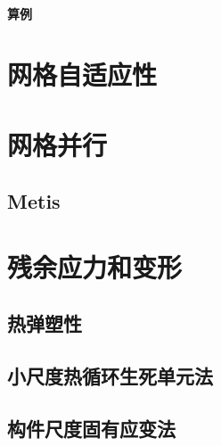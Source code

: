 \subsubsection{算例}

\chapter{网格自适应性}

\chapter{网格并行}

\section{Metis}

\chapter{残余应力和变形}

\section{热弹塑性}

\section{小尺度热循环生死单元法}

\section{构件尺度固有应变法}
